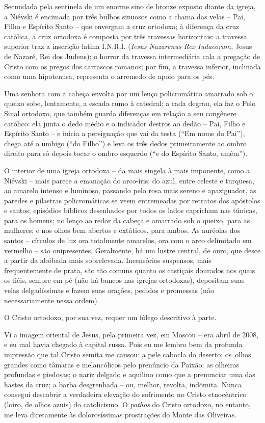 Secundada pela sentinela de um enorme sino de bronze exposto diante da
igreja, a Niévski é encimada por três bulbos sinuosos como a chama das
velas -- Pai, Filho e Espírito Santo -- que envergam a cruz ortodoxa; à
diferença da cruz católica, a cruz ortodoxa é composta por três
travessas horizontais: a travessa superior traz a inscrição latina
I.N.R.I. (\emph{Iesus Nazarenus Rex Iudaeorum,} Jesus de Nazaré, Rei dos
Judeus); o horror da travessa intermediária cala a pregação de Cristo
com os pregos dos carrascos romanos; por fim, a travessa inferior,
inclinada como uma hipotenusa, representa o arremedo de apoio para os
pés.

Uma senhora com a cabeça envolta por um lenço policromático amarrado sob
o queixo sobe, lentamente, a escada rumo à catedral; a cada degrau, ela
faz o Pelo Sinal ortodoxo, que também guarda diferenças em relação a seu
congênere católico: ela junta o dedo médio e o indicador destros ao
dedão -- Pai, Filho e Espírito Santo -- e inicia a persignação que vai
da testa (``Em nome do Pai''), chega até o umbigo (``do Filho'') e leva
os três dedos primeiramente ao ombro direito para só depois tocar o
ombro esquerdo (``e do Espírito Santo, amém'').

O interior de uma igreja ortodoxa -- da mais singela à mais imponente,
como a Niévski -- mais parece a emanação do arco-íris: do azul, entre
celeste e turquesa, ao amarelo intenso e luminoso, passando pelo rosa
mais sereno e apaziguador, as paredes e pilastras policromáticas se veem
entremeadas por retratos dos apóstolos e santos; episódios bíblicos
desenhados por todos os lados capricham nas túnicas, para os homens; no
lenço ao redor da cabeça e amarrado sob o queixo, para as mulheres; e
nos olhos bem abertos e extáticos, para ambos. As auréolas dos santos --
círculos de luz ora totalmente amarelos, ora com o arco delimitado em
vermelho -- são onipresentes. Geralmente, há um lustre central, de ouro,
que desce a partir da abóbada mais sobrelevada. Incensórios suspensos,
mais frequentemente de prata, são tão comuns quanto os castiçais
dourados nos quais os fiéis, sempre em pé (não há bancos nas igrejas
ortodoxas), depositam suas velas delgadíssimas e fazem suas orações,
pedidos e promessas (não necessariamente nessa ordem).

O Cristo ortodoxo, por sua vez, requer um fôlego descritivo à parte.

Vi a imagem oriental de Jesus, pela primeira vez, em Moscou -- era abril
de 2008, e eu mal havia chegado à capital russa. Pois eu me lembro bem
da profunda impressão que tal Cristo semita me causou: a pele cabocla do
deserto; os~olhos grandes como tâmaras e melancólicos pelo prenúncio da
Paixão; as olheiras profundas e piedosas; o nariz delgado e aquilino
como que a prenunciar uma das hastes da cruz; a barba desgrenhada -- ou,
melhor, revolta, indômita. Nunca consegui descobrir a verdadeira
elevação do sofrimento no Cristo etnocêntrico (loiro, de olhos azuis) do
catolicismo. O \emph{pathos} do Cristo ortodoxo, no entanto, me leva
diretamente às dolorosíssimas prostrações do Monte das Oliveiras.

